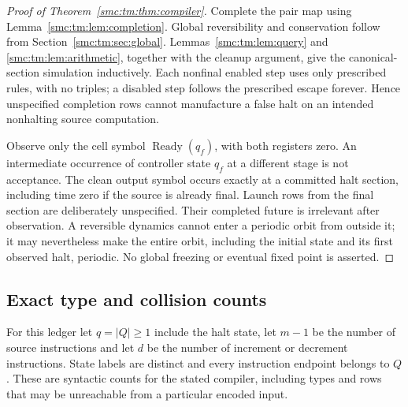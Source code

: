 \documentclass[11pt,letterpaper]{article}
\numberwithin{equation}{section}
\theoremstyle{definition}
\theoremstyle{remark}
\newcommand{\Ready}{\operatorname{Ready}}
\begin{document}
\begin{proof}[Proof of Theorem~\ref{smc:tm:thm:compiler}]
Complete the pair map using Lemma~\ref{smc:tm:lem:completion}. Global reversibility and conservation follow from Section~\ref{smc:tm:sec:global}. Lemmas~\ref{smc:tm:lem:query} and \ref{smc:tm:lem:arithmetic}, together with the cleanup argument, give the canonical-section simulation inductively. Each nonfinal enabled step uses only prescribed rules, with no triples; a disabled step follows the prescribed escape forever. Hence unspecified completion rows cannot manufacture a false halt on an intended nonhalting source computation.

Observe only the cell symbol $\Ready(q_f)$, with both registers zero. An intermediate occurrence of controller state $q_f$ at a different stage is not acceptance. The clean output symbol occurs exactly at a committed halt section, including time zero if the source is already final. Launch rows from the final section are deliberately unspecified. Their completed future is irrelevant after observation. A reversible dynamics cannot enter a periodic orbit from outside it; it may nevertheless make the entire orbit, including the initial state and its first observed halt, periodic. No global freezing or eventual fixed point is asserted.
\end{proof}

\subsection{Exact type and collision counts}\label{smc:tm:sec:counts}

For this ledger let $q=|Q|\ge1$ include the halt state, let $m-1$ be the
number of source instructions and let $d$ be the number of increment or
decrement instructions. State labels are distinct and every instruction
endpoint belongs to $Q$. These are syntactic counts for the stated
compiler, including types and rows that may be unreachable from a
particular encoded input.
\end{document}
